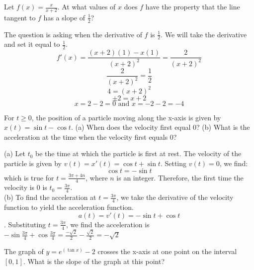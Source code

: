 \begin{Exercise}
     Let 
    $f(x) = \frac{x}{x + 2}$. At what values of $x$ does $f$ have the 
    property that the line tangent to $f$ has a slope of $\frac{1}{2}$?
\end{Exercise}

\begin{Answer}
    [ref=deriv_rules6]
    The question is asking when the derivative of $f$ is $\frac{1}{2}$.
     We will take the derivative and set it equal to $\frac{1}{2}$. 
     $$f'(x) = \frac{(x + 2)(1) - x(1)}{(x + 2)^2}=\frac{2}{(x + 2)^2}$$
    $$\frac{2}{(x + 2)^2}=\frac{1}{2}$$
    $$4=(x + 2)^2$$
    $$\pm 2 = x + 2$$
    $$x= 2 - 2 = 0 \text{ and } x = -2 - 2 = -4$$
\end{Answer}

\begin{Exercise}
    [label=deriv_rules7]
    For $t \geq 0$, the position of a particle moving along the x-axis 
    is given by $x(t) = \sin{t} - \cos{t}$. (a) When does the velocity 
    first equal $0$? (b) What is the acceleration at the time when the 
    velocity first equals $0$?
\end{Exercise}

\begin{Answer}
    [ref=deriv_rules7]
    (a) Let $t_0$ be the time at which the particle is first at rest. 
    The velocity of the particle is given by $v(t) = x'(t) = \cos{t} 
    + \sin{t}$. Setting $v(t) = 0$, we find:
    $$\cos{t} = -\sin{t}$$ 
    which is true for $ t = \frac{3\pi + 4n}{4}$, where $n$ is an 
    integer. Therefore, the first time the velocity is $0$ is $t_0 = 
    \frac{3\pi}{4}$. \\
    (b) To find the acceleration at $t=\frac{3\pi}{4}$, we take the 
    derivative of the velocity function to yield the acceleration 
    function. $$a(t) = v'(t) = -\sin{t} + \cos{t}$$. Substituting $t =
    \frac{3\pi}{4}$, we find the acceleration is $-\sin{\frac{3\pi}{4}}
     + \cos{\frac{3\pi}{4}} = \frac{-\sqrt{2}}{2} - \frac{\sqrt{2}}{2} 
     = -\sqrt{2}$
\end{Answer}

\begin{Exercise}
    [label=deriv_rules8]
    The graph of $y=e^(\tan{x}) - 2$ crosses the x-axis at one point 
    on the interval $[0, 1]$. What is the slope of the graph at this 
    point?
\end{Exercise}

